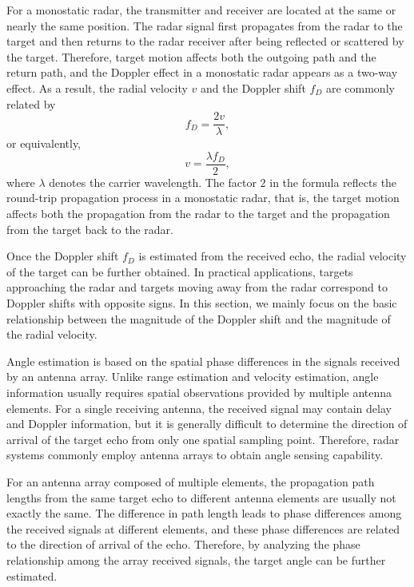 For a monostatic radar, the transmitter and receiver are located at the same
or nearly the same position.
The radar signal first propagates from the radar to the target and then returns
to the radar receiver after being reflected or scattered by the target.
Therefore, target motion affects both the outgoing path and the return path,
and the Doppler effect in a monostatic radar appears as a two-way effect.
As a result, the radial velocity \(v\) and the Doppler shift \(f_D\) are
commonly related by
\begin{equation}
    f_D=\frac{2v}{\lambda},
    \label{eq:radar_doppler_shift}
\end{equation}
or equivalently,
\begin{equation}
    v=\frac{\lambda f_D}{2},
    \label{eq:radar_velocity_estimation}
\end{equation}
where \(\lambda\) denotes the carrier wavelength.
The factor \(2\) in the formula reflects the round-trip propagation process
in a monostatic radar, that is, the target motion affects both the propagation
from the radar to the target and the propagation from the target back to the
radar.

Once the Doppler shift \(f_D\) is estimated from the received echo, the radial
velocity of the target can be further obtained.
In practical applications, targets approaching the radar and targets moving
away from the radar correspond to Doppler shifts with opposite signs.
In this section, we mainly focus on the basic relationship between the
magnitude of the Doppler shift and the magnitude of the radial velocity.

Angle estimation is based on the spatial phase differences in the signals
received by an antenna array.
Unlike range estimation and velocity estimation, angle information usually
requires spatial observations provided by multiple antenna elements.
For a single receiving antenna, the received signal may contain delay and
Doppler information, but it is generally difficult to determine the direction
of arrival of the target echo from only one spatial sampling point.
Therefore, radar systems commonly employ antenna arrays to obtain angle
sensing capability.

For an antenna array composed of multiple elements, the propagation path lengths
from the same target echo to different antenna elements are usually not exactly
the same.
The difference in path length leads to phase differences among the received
signals at different elements, and these phase differences are related to the
direction of arrival of the echo.
Therefore, by analyzing the phase relationship among the array received signals,
the target angle can be further estimated.

